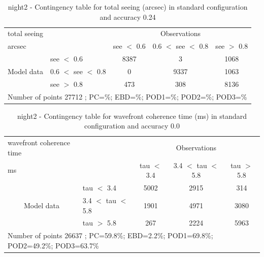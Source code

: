 \begin{table}[p!]
\begin{center}
\begin{tabular}{llccc}
\hline
{total seeing}                                       &                                                    & \multicolumn{3}{c}{Observations}                 \\
{arcsec}                                       &                             & see $<$ 0.6   & 0.6 $<$ see $<$ 0.8 & see $>$ 0.8 \\
\hline
\multicolumn{1}{c}{\multirow{3}{*}{Model data}}  & see $<$ 0.6             & 8387                & 3                       & 1068              \\
                                                 & 0.6  $<$ see $<$ 0.8 & 0                & 9337                       & 1063              \\
                                                 & see $>$ 0.8             & 473                & 308                       & 8136              \\
\hline
\multicolumn{5}{l}{ Number of points        27712 ; PC=\%; EBD=\%; POD1=\%; POD2=\%; POD3=\%}
\end{tabular}
\end{center}
\caption{night2 - Contingency table for  total seeing (arcsec) in standard configuration and accuracy 0.24}
\label{tab:contingencyseeBEF:night2}
\end{table}
\clearpage
\begin{table}[p!]
\begin{center}
\begin{tabular}{llccc}
\hline
{wavefront coherence time}                                       &                                                    & \multicolumn{3}{c}{Observations}                 \\
{ms}                                       &                             & tau $<$ 3.4   & 3.4 $<$ tau $<$ 5.8 & tau $>$ 5.8 \\
\hline
\multicolumn{1}{c}{\multirow{3}{*}{Model data}}  & tau $<$ 3.4             & 5002                & 2915                       & 314              \\
                                                 & 3.4  $<$ tau $<$ 5.8 & 1901                & 4971                       & 3080              \\
                                                 & tau $>$ 5.8             & 267                & 2224                       & 5963              \\
\hline
\multicolumn{5}{l}{ Number of points        26637 ; PC=59.8\%; EBD=2.2\%; POD1=69.8\%; POD2=49.2\%; POD3=63.7\%}
\end{tabular}
\end{center}
\caption{night2 - Contingency table for  wavefront coherence time (ms) in standard configuration and accuracy 0.0}
\label{tab:contingencytauBEF:night2}
\end{table}
